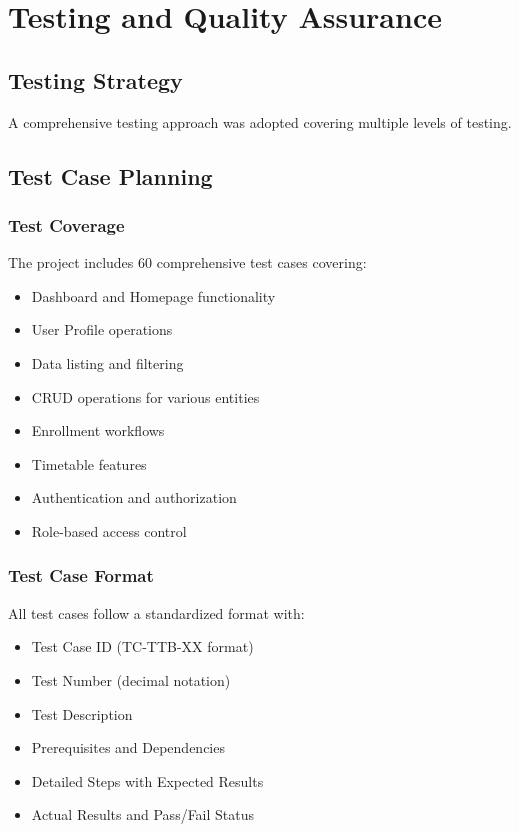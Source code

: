 \documentclass[12pt,a4paper]{report}
\begin{document}
\chapter{Testing and Quality Assurance}

\section{Testing Strategy}
A comprehensive testing approach was adopted covering multiple levels of testing.

\section{Test Case Planning}
\subsection{Test Coverage}
The project includes 60 comprehensive test cases covering:
\begin{itemize}[leftmargin=*]
    \item Dashboard and Homepage functionality
    \item User Profile operations
    \item Data listing and filtering
    \item CRUD operations for various entities
    \item Enrollment workflows
    \item Timetable features
    \item Authentication and authorization
    \item Role-based access control
\end{itemize}

\subsection{Test Case Format}
All test cases follow a standardized format with:
\begin{itemize}[leftmargin=*]
    \item Test Case ID (TC-TTB-XX format)
    \item Test Number (decimal notation)
    \item Test Description
    \item Prerequisites and Dependencies
    \item Detailed Steps with Expected Results
    \item Actual Results and Pass/Fail Status
\end{itemize}
\end{document}
